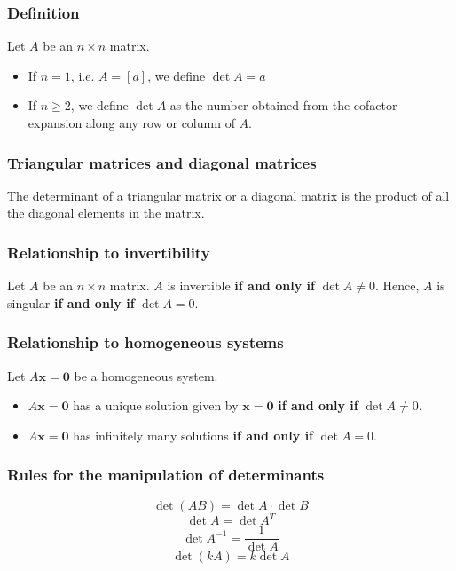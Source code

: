 \documentclass[11pt]{article}
\begin{document}
\subsubsection{Definition}
\label{sec:org7dbd6b6}
Let \(A\) be an \(n \times n\) matrix.
\begin{itemize}
\item If \(n = 1\), i.e. \(A = [a]\), we define \(\det A = a\)
\item If \(n \ge 2\), we define \(\det A\) as the number obtained from the cofactor expansion along any row or column of \(A\).
\end{itemize}

\subsubsection{Triangular matrices and diagonal matrices}
\label{sec:org3814e4e}
The determinant of a triangular matrix or a diagonal matrix is the product of all the diagonal elements in the matrix.

\subsubsection{Relationship to invertibility}
\label{sec:org3d78af3}
Let \(A\) be an \(n \times n\) matrix. \(A\) is invertible \textbf{if and only if} \(\det A \ne 0\). Hence, \(A\) is singular \textbf{if and only if} \(\det A = 0\).

\subsubsection{Relationship to homogeneous systems}
\label{sec:org782285a}
Let \(A \boldsymbol{x} = \boldsymbol{0}\) be a homogeneous system.

\begin{itemize}
\item \(A \boldsymbol{x} = \boldsymbol{0}\) has a unique solution given by \(\boldsymbol{x} = \boldsymbol{0}\) \textbf{if and only if} \(\det A \ne 0\).
\item \(A \boldsymbol{x} = \boldsymbol{0}\) has infinitely many solutions \textbf{if and only if} \(\det A = 0\).
\end{itemize}

\subsubsection{Rules for the manipulation of determinants}
\label{sec:org7363e53}
\[\det (AB) = \det A \cdot \det B\]
\[\det A = \det A^T\]
\[\det A^{-1} = \frac{1}{\det A}\]
\[\det (kA) = k \det A\]
\end{document}
